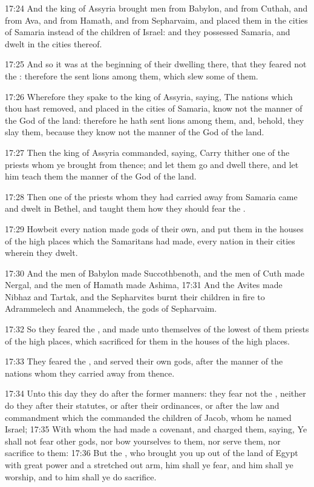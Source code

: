 17:24 And the king of Assyria brought men from Babylon, and from
Cuthah, and from Ava, and from Hamath, and from Sepharvaim, and placed
them in the cities of Samaria instead of the children of Israel: and
they possessed Samaria, and dwelt in the cities thereof.

17:25 And so it was at the beginning of their dwelling there, that
they feared not the \LORD: therefore the \LORD sent lions among them,
which slew some of them.

17:26 Wherefore they spake to the king of Assyria, saying, The nations
which thou hast removed, and placed in the cities of Samaria, know not
the manner of the God of the land: therefore he hath sent lions among
them, and, behold, they slay them, because they know not the manner of
the God of the land.

17:27 Then the king of Assyria commanded, saying, Carry thither one of
the priests whom ye brought from thence; and let them go and dwell
there, and let him teach them the manner of the God of the land.

17:28 Then one of the priests whom they had carried away from Samaria
came and dwelt in Bethel, and taught them how they should fear the
\LORD.

17:29 Howbeit every nation made gods of their own, and put them in the
houses of the high places which the Samaritans had made, every nation
in their cities wherein they dwelt.

17:30 And the men of Babylon made Succothbenoth, and the men of Cuth
made Nergal, and the men of Hamath made Ashima, 17:31 And the Avites
made Nibhaz and Tartak, and the Sepharvites burnt their children in
fire to Adrammelech and Anammelech, the gods of Sepharvaim.

17:32 So they feared the \LORD, and made unto themselves of the lowest
of them priests of the high places, which sacrificed for them in the
houses of the high places.

17:33 They feared the \LORD, and served their own gods, after the
manner of the nations whom they carried away from thence.

17:34 Unto this day they do after the former manners: they fear not
the \LORD, neither do they after their statutes, or after their
ordinances, or after the law and commandment which the \LORD commanded
the children of Jacob, whom he named Israel; 17:35 With whom the \LORD
had made a covenant, and charged them, saying, Ye shall not fear other
gods, nor bow yourselves to them, nor serve them, nor sacrifice to
them: 17:36 But the \LORD, who brought you up out of the land of Egypt
with great power and a stretched out arm, him shall ye fear, and him
shall ye worship, and to him shall ye do sacrifice.

